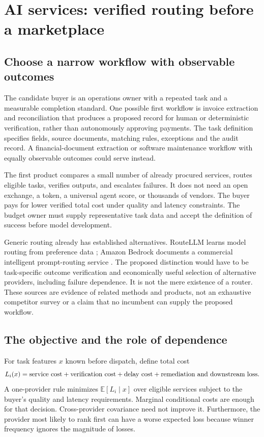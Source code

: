 \documentclass[11pt]{article}
\newcommand{\E}{\mathbb E}
\theoremstyle{remark}\newtheorem{example}{Example}
\begin{document}
\section{AI services: verified routing before a marketplace}
\subsection{Choose a narrow workflow with observable outcomes}
The candidate buyer is an operations owner with a repeated task and a
measurable completion standard. One possible first workflow is invoice
extraction and reconciliation that produces a proposed record for human or
deterministic verification, rather than autonomously approving payments.
The task definition specifies fields, source documents, matching rules,
exceptions and the audit record. A financial-document extraction or software
maintenance workflow with equally observable outcomes could serve instead.

The first product compares a small number of already procured services, routes
eligible tasks, verifies outputs, and escalates failures. It does not need an
open exchange, a token, a universal agent score, or thousands of vendors.
The buyer pays for lower verified total cost under quality and latency
constraints. The budget owner must supply representative task data and accept
the definition of success before model development.

Generic routing already has established alternatives. RouteLLM learns model
routing from preference data \citep{routellm}; Amazon Bedrock documents a
commercial intelligent prompt-routing service \citep{bedrock}. The proposed
distinction would have to be task-specific outcome verification and economically
useful selection of alternative providers, including failure dependence. It is
not the mere existence of a router. These sources are evidence of related
methods and products, not an exhaustive competitor survey or a claim that no
incumbent can supply the proposed workflow.

\subsection{The objective and the role of dependence}
For task features $x$ known before dispatch, define total cost
\begin{equation}\label{eq:routingloss}
 L_i(x)=\hbox{service cost}+\hbox{verification cost}
 +\hbox{delay cost}+\hbox{remediation and downstream loss}.
\end{equation}
A one-provider rule minimizes $\E[L_i\mid x]$ over eligible services subject
to the buyer's quality and latency requirements. Marginal conditional costs
are enough for that decision. Cross-provider covariance need not improve it.
Furthermore, the provider most likely to rank first can have a worse expected
loss because winner frequency ignores the magnitude of losses.
\end{document}
